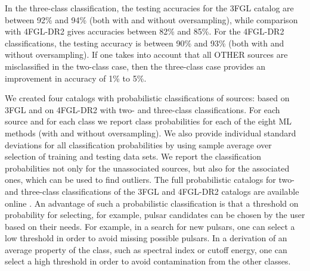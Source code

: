 \documentclass[referee]{aa} %
\begin{document}
In the three-class classification, the testing accuracies for the 3FGL catalog are between 92\% and 94\% (both with and without oversampling), while comparison with 4FGL-DR2 gives accuracies between 82\% and 85\%. For the 4FGL-DR2 classifications, the testing accuracy is between 90\% and 93\% (both with and without oversampling). If one takes into account that all OTHER sources are misclassified in the two-class case, then the three-class case provides an improvement in accuracy of 1\% to 5\%.

We created four catalogs with probabilistic classifications of sources: based on 3FGL and on 4FGL-DR2 with two- and three-class classifications.
For each source and for each class we report class probabilities for each of the eight ML methods (with and without oversampling). 
We also provide individual standard deviations for all classification probabilities by using sample average over selection of training and testing data sets.
We report the classification probabilities not only for the unassociated sources, but also for the associated ones, which can be used to find outliers.
The full probabilistic catalogs for two- and three-class classifications of the 3FGL and 4FGL-DR2 catalogs are available online \citep{SOM_material}.
An advantage of such a probabilistic classification is that a threshold on probability for selecting, for example, pulsar candidates can be chosen by the user based on their needs.
For example, in a search for new pulsars, one can select a low threshold in order to avoid missing possible pulsars.
In a derivation of an average property of the class, such as spectral index or cutoff energy, one can select a high threshold in order to avoid contamination from the other classes.
\end{document}
